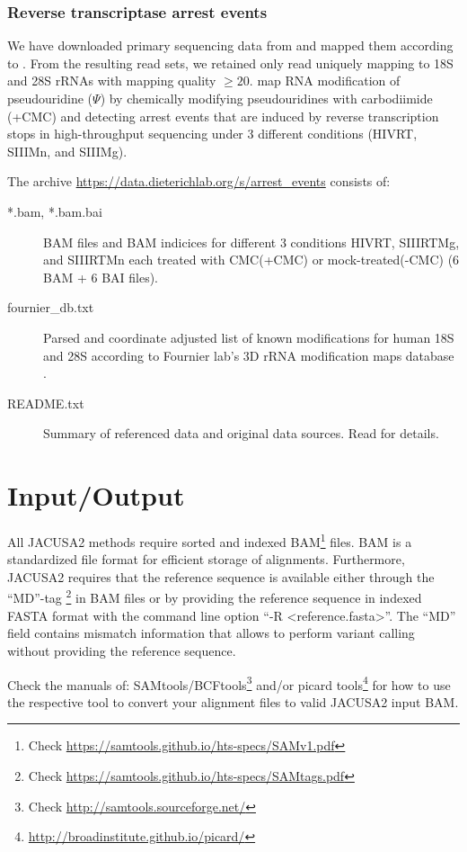 \documentclass[10pt,a4paper]{article} \usepackage[utf8]{inputenc}
\begin{document}
\subsubsection{Reverse transcriptase arrest events}
We have downloaded primary sequencing data from \cite{Zhou2018} and mapped them according to
.
From the resulting read sets, we retained only read uniquely mapping to 18S and 28S rRNAs with
mapping quality $\ge 20$.
\cite{Zhou2018} map RNA modification of pseudouridine ($\Psi$) by chemically modifying
pseudouridines with carbodiimide (+CMC) and detecting arrest events that are induced by reverse
transcription stops in high-throughput sequencing under 3 different conditions (HIVRT, SIIIMn, and
SIIIMg).

The archive \url{https://data.dieterichlab.org/s/arrest_events} consists of:
\begin{description}
  \item[*.bam, *.bam.bai] BAM files and BAM indicices for different 3 conditions HIVRT, SIIIRTMg,
  and SIIIRTMn each treated with CMC(+CMC) or mock-treated(-CMC) (6 BAM + 6 BAI files).
  \item[fournier\_db.txt] Parsed and coordinate adjusted list of known modifications for human 18S
  and 28S according to Fournier lab's 3D rRNA modification maps database \cite{PieknaPrzybylska2007}.
  \item[README.txt] Summary of referenced data and original data sources. Read for details.
\end{description}
\section{Input/Output}
All JACUSA2 methods require sorted and indexed BAM\footnote{Check 
\url{https://samtools.github.io/hts-specs/SAMv1.pdf}} files.
BAM is a standardized file format for efficient storage of alignments.
Furthermore, JACUSA2 requires that the reference sequence is available either through the ``MD''-tag
\footnote{Check \url{https://samtools.github.io/hts-specs/SAMtags.pdf}} in BAM files or by providing 
the reference sequence in indexed FASTA format with the command line option ``-R <reference.fasta>''.
The ``MD'' field contains mismatch information that allows to perform variant calling without
providing the reference sequence.

Check the manuals of: SAMtools/BCFtools\footnote{Check \url{http://samtools.sourceforge.net/}} and/or
picard tools\footnote{\url{http://broadinstitute.github.io/picard/}} for how to use the respective tool to
convert your alignment files to valid JACUSA2 input BAM.
\end{document}

